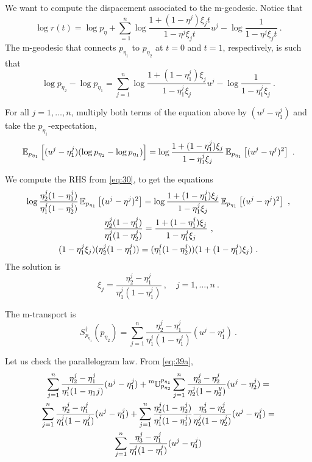\documentclass[12pt,a4paper]{amsart}
\begin{document}
We want to compute the dispacement associated to the m-geodesic. Notice that
\begin{equation}
  \label{eq:45}
   \log r(t) = \log p_\eta + \sum_{=1}^n \log \frac{1 + (1-\eta^j) \xi_j t}{1 -\eta^j\xi_j t} u^j - \log \frac1{1 -\eta^j\xi_j t} \ . 
 \end{equation}
 The m-geodesic that connects $p_{\eta_1}$ to $p_{\eta_2}$ at $t=0$ and $t=1$, respectively, is such that
 \begin{equation}
   \label{eq:46}
   \log p_{\eta_2} - \log p_{\eta_1} = \sum_{j=1}^n \log \frac{1 + (1-\eta^j_1) \xi_j}{1 -\eta^j_1\xi_j} u^j - \log \frac1{1 -\eta^j_1\xi_j} \ .
 \end{equation}
 
 For all $j = 1,\dots,n$, multiply both terms of the equation above by $(u^j - \eta_1^j)$ and take the $p_{\eta_1}$-expectation,
 \begin{equation}
   \label{eq:43}
   \operatorname{\mathbb E}_{p_{\eta_1}}\left[(u^j-\eta^j_1)(\log p_{\eta_2} - \log p_{\eta_1})\right] = \log \frac{1 + (1-\eta^j_1) \xi_j}{1 -\eta^j_1\xi_j} \operatorname{\mathbb E}_{p_{\eta_1}}\left[(u^j - \eta^j)^2\right] \ .
 \end{equation}
 
 We compute the RHS from \cref{eq:30}, to get the equations
 \begin{gather}
   \label{eq:47}
   \log \frac {\eta^j_2(1 - \eta^j_1)}{\eta^j_1 (1- \eta^j_2)} \operatorname{\mathbb E}_{p_{\eta_1}}\left[(u^j - \eta^j)^2\right] = \log \frac{1 + (1-\eta^j_1) \xi_j}{1 -\eta^j_1\xi_j} \operatorname{\mathbb E}_{p_{\eta_1}}\left[(u^j - \eta^j)^2\right] \ , \\
   \frac {\eta^j_2(1 - \eta^j_1)}{\eta^j_1 (1- \eta^j_2)} = \frac{1 + (1-\eta^j_1) \xi_j}{1 -\eta^j_1\xi_j} \ , \\
 (1 -\eta^j_1\xi_j)(\eta^j_2(1 - \eta^j_1)) = (\eta^j_1 (1- \eta^j_2))(1 + (1-\eta^j_1) \xi_j) \ .
 \end{gather}
The solution is
\begin{equation}
  \label{eq:52}
  \xi_j = \frac{\eta^j_2-\eta^j_1}{\eta^j_1(1-\eta^j_1)} \ , \quad j=1,\dots,n \ .
\end{equation}

The m-transport is
\begin{equation}
  \label{eq:53}
  S^\dagger _{p_{\eta_1}}(p_{\eta_2}) = \sum_{j=1}^n \frac{\eta^j_2-\eta^j_1}{\eta^j_1(1-\eta^j_1)} (u^j - \eta^j_1) \ . 
\end{equation}

 Let us check the parallelogram law. From \cref{eq:39a},
 \begin{multline}
   \label{eq:48}
   \sum_{j=1}^n \frac{\eta^j_2-\eta_1^j}{\eta_1^j(1-\eta_1j)}(u^j-\eta_1^j) + \prescript{\text{m}}{} {\mathbb U} _ {p_{\eta_2}} ^ {p_{\eta_1}} \sum_{j=1}^n \frac{\eta^j_3-\eta_2^j}{\eta_2^j(1-\eta_2^y)}(u^j-\eta_2^j) = \\
   \sum_{j=1}^n \frac{\eta^j_2-\eta_1^j}{\eta_1^j(1-\eta_1^j)}(u^j-\eta_1^j) + \sum_{j=1}^n  \frac{\eta^j_2(1-\eta^j_2)} {\eta^j_1(1-\eta^j_1)} \frac{\eta^j_3-\eta_2^j}{\eta_2^j(1-\eta_2^j)}(u^j-\eta_1^j) = \\
   \sum_{j=1}^n \frac{\eta^j_3-\eta_1^j}{\eta_1^j(1-\eta_1^j)}(u^j-\eta_1^j) 
 \end{multline}
\end{document}
